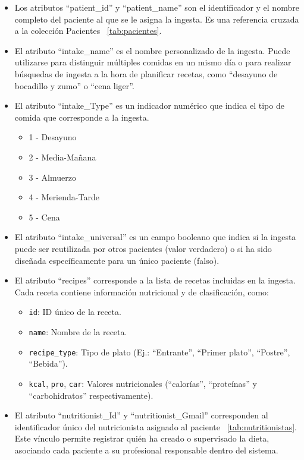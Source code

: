 \begin{itemize}
    \item Los atributos ``patient\_id'' y ``patient\_name'' son el identificador y el nombre completo del paciente al que se le asigna la ingesta. Es una referencia cruzada a la colección Pacientes ~\ref{tab:pacientes}.
    
    \item El atributo ``intake\_name'' es el nombre personalizado de la ingesta. Puede utilizarse para distinguir múltiples comidas en un mismo día o para realizar búsquedas de ingesta a la hora de planificar recetas, como ``desayuno de bocadillo y zumo'' o ``cena liger''.

    \item El atributo ``intake\_Type'' es un indicador numérico que indica el tipo de comida que corresponde a la ingesta.
    \begin{itemize}
        \item 1 - Desayuno
        \item 2 - Media-Mañana
        \item 3 - Almuerzo
        \item 4 - Merienda-Tarde
        \item 5 - Cena
    \end{itemize}

    \item El atributo ``intake\_universal'' es un campo booleano que indica si la ingesta puede ser reutilizada por otros pacientes (valor verdadero) o si ha sido diseñada específicamente para un único paciente (falso).

    \item El atributo ``recipes'' corresponde a la lista de recetas incluidas en la ingesta. Cada receta contiene información nutricional y de clasificación, como:
    \begin{itemize}
        \item \texttt{id}: ID único de la receta.
        \item \texttt{name}: Nombre de la receta.
        \item \texttt{recipe\_type}: Tipo de plato (Ej.: ``Entrante'', ``Primer plato'', ``Postre'', ``Bebida'').
        \item \texttt{kcal}, \texttt{pro}, \texttt{car}: Valores nutricionales (``calorías'', ``proteínas'' y ``carbohidratos'' respectivamente).
    \end{itemize}

    \item El atributo ``nutritionist\_Id'' y  ``nutritionist\_Gmail'' corresponden al identificador único del nutricionista asignado al paciente ~\ref{tab:nutritionistas}. Este vínculo permite registrar quién ha creado o supervisado la dieta, asociando cada paciente a su profesional responsable dentro del sistema.
    
\end{itemize}
